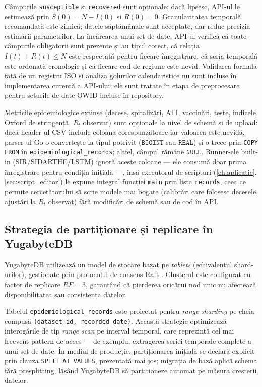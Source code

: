 Câmpurile \texttt{susceptible} și \texttt{recovered} sunt opționale; dacă
lipsesc, API-ul le estimează prin $S(0) = N - I(0)$ și $R(0) = 0$.
Granularitatea temporală recomandată este zilnică; datele săptămânale sunt
acceptate, dar reduc precizia estimării parametrilor. La încărcarea unui set
de date, API-ul verifică că toate câmpurile obligatorii sunt prezente și au
tipul corect, că relația $I(t) + R(t) \leq N$ este respectată pentru fiecare
înregistrare, că seria temporală este ordonată cronologic și că fiecare cod de
regiune este nevid. Validarea formală față de un registru ISO și analiza
golurilor calendaristice nu sunt incluse în implementarea curentă a API-ului;
ele sunt tratate în etapa de preprocesare pentru seturile de date OWID incluse în
repository.

Metricile epidemiologice extinse (decese, spitalizări, ATI, vaccinări, teste,
indicele Oxford de stringență, $R_t$ observat) sunt opționale la nivel de schemă
și de upload: dacă header-ul CSV include coloana corespunzătoare iar valoarea
este nevidă, parser-ul Go o convertește la tipul potrivit ($\texttt{BIGINT}$
sau $\texttt{REAL}$) și o trece prin \texttt{COPY FROM} în
\texttt{epidemiological\_records}; altfel, câmpul rămâne $\texttt{NULL}$.
Runner-ele built-in (SIR/SIDARTHE/LSTM) ignoră aceste coloane --- ele
consumă doar prima înregistrare pentru condiția inițială ---, însă executorul
de scripturi (\cref{ch:aplicatie}, \cref{sec:script_editor}) le expune
integral funcției \texttt{main} prin lista \texttt{records}, ceea ce permite
cercetătorului să scrie modele mai bogate (calibrări care folosesc decesele,
ajustări la $R_t$ observat) fără modificări de schemă sau de cod în API.

\subsection{Strategia de partiționare și replicare în YugabyteDB}
\label{subsec:strategie_partitionare}

YugabyteDB utilizează un model de stocare bazat pe \emph{tablets}
(echivalentul shard-urilor), gestionate prin protocolul de consens Raft
\cite{ongaro2014raft}. Clusterul este configurat cu factor de replicare
$RF = 3$, garantând că pierderea oricărui nod unic nu afectează
disponibilitatea sau consistența datelor.

Tabelul \texttt{epidemiological\_records} este proiectat pentru \emph{range
sharding} pe cheia compusă \texttt{(dataset\_id, recorded\_date)}.
Această strategie optimizează interogările de tip \emph{range scan} pe
interval temporal, care reprezintă cel mai frecvent pattern de acces ---
de exemplu, extragerea seriei temporale complete a unui set de date.
În mediul de producție, partiționarea inițială se declară explicit prin
clauza \texttt{SPLIT AT VALUES}, prezentată mai jos; migrația de bază
aplică schema fără presplitting, lăsând YugabyteDB să partitioneze
automat pe măsura creșterii datelor.

